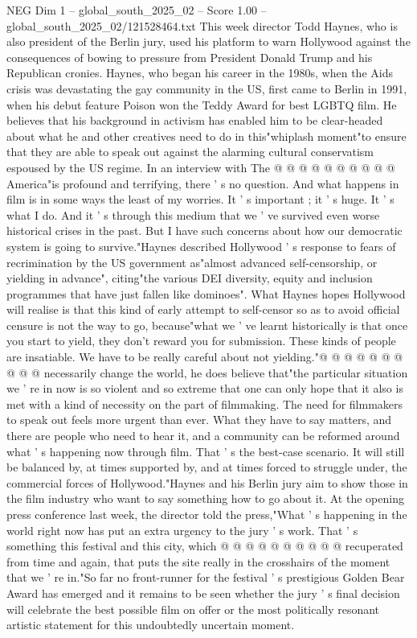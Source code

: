 \begin{textsample}{NEG Dim 1 – global\_south\_2025\_02 – Score 1.00 – global\_south\_2025\_02/121528464.txt}
This week director Todd Haynes, who is also president of the Berlin jury, used his platform to warn Hollywood against the consequences of bowing to pressure from President Donald Trump and his Republican cronies.
Haynes, who began his career in the 1980s, when the Aids crisis was devastating the gay community in the US, first came to Berlin in 1991, when his debut feature Poison won the Teddy Award for best LGBTQ film.
He believes that his background in activism has enabled him to be clear-headed about what he and other creatives need to do in this"whiplash moment"to ensure that they are able to speak out against the alarming cultural conservatism espoused by the US regime.
In an interview with The @ @ @ @ @ @ @ @ @ @ America"is profound and terrifying, there ' s no question.
And what happens in film is in some ways the least of my worries.
It ' s important ; it ' s huge.
It ' s what I do.
And it ' s through this medium that we ' ve survived even worse historical crises in the past.
But I have such concerns about how our democratic system is going to survive."Haynes described Hollywood ' s response to fears of recrimination by the US government as"almost advanced self-censorship, or yielding in advance", citing"the various DEI diversity, equity and inclusion programmes that have just fallen like dominoes".
What Haynes hopes Hollywood will realise is that this kind of early attempt to self-censor so as to avoid official censure is not the way to go, because"what we ' ve learnt historically is that once you start to yield, they don't reward you for submission.
These kinds of people are insatiable.
We have to be really careful about not yielding."@ @ @ @ @ @ @ @ @ @ necessarily change the world, he does believe that"the particular situation we ' re in now is so violent and so extreme that one can only hope that it also is met with a kind of necessity on the part of filmmaking.
The need for filmmakers to speak out feels more urgent than ever.
What they have to say matters, and there are people who need to hear it, and a community can be reformed around what ' s happening now through film.
That ' s the best-case scenario.
It will still be balanced by, at times supported by, and at times forced to struggle under, the commercial forces of Hollywood."Haynes and his Berlin jury aim to show those in the film industry who want to say something how to go about it.
At the opening press conference last week, the director told the press,"What ' s happening in the world right now has put an extra urgency to the jury ' s work.
That ' s something this festival and this city, which @ @ @ @ @ @ @ @ @ @ recuperated from time and again, that puts the site really in the crosshairs of the moment that we ' re in."So far no front-runner for the festival ' s prestigious Golden Bear Award has emerged and it remains to be seen whether the jury ' s final decision will celebrate the best possible film on offer or the most politically resonant artistic statement for this undoubtedly uncertain moment.

\end{textsample}
